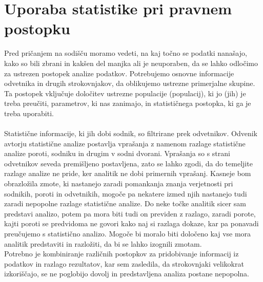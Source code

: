 \documentclass[12pt,a4paper]{amsart}
\theoremstyle{definition} %
\theoremstyle{plain} %
\begin{document}
\section{Uporaba statistike pri pravnem postopku}
Pred pričanjem na sodišču moramo vedeti, na kaj točno se podatki nanašajo, kako so bili zbrani in kakšen del manjka ali je neuporaben, da se lahko odločimo 
za ustrezen postopek analize podatkov. Potrebujemo osnovne informacije odvetnika in drugih strokovnjakov, da oblikujemo ustrezne primerjalne skupine. Ta 
postopek vključuje določitev ustrezne populacije (populacij), ki jo (jih) je treba preučiti, parametrov, ki nas zanimajo, in statističnega postopka, ki ga je 
treba uporabiti. \\\\
Statistične informacije, ki jih dobi sodnik, so filtrirane prek odvetnikov. Odvenik avtorju statistične analize postavlja vprašanja z namenom razlage 
statistične analize poroti, sodniku in drugim v sodni dvorani. Vprašanja so s strani odvetnikov seveda premišljeno postavljena, zato se lahko zgodi, da do 
temeljite razlage analize ne pride, ker analitik ne dobi primernih vprašanj. Kasneje bom obrazložila zmote, ki nastanejo zaradi pomankanja znanja verjetnosti 
pri sodnikih, poroti in odvetnikih, mogoče pa nekatere izmed njih nastanejo tudi zaradi nepopolne razlage statistične analize. Do neke točke analitik sicer sam 
predstavi analizo, potem pa mora biti tudi on previden z razlago, zaradi porote, kajti poroti se predvidoma ne govori kako naj si razlaga dokaze, kar pa ponavadi preučujemo 
s statistično analizo. Mogoče bi moralo biti določeno kaj vse mora analitik predstaviti in razložiti, da bi se lahko izognili zmotam.\\
Potrebno je kombiniranje različnih postopkov za pridobivanje informacij iz podatkov in razlago rezultatov, kar sem zasledila, da strokovnjaki velikokrat 
izkoriščajo, se ne poglobijo dovolj in predstavljena analiza postane nepopolna.

\end{document}
